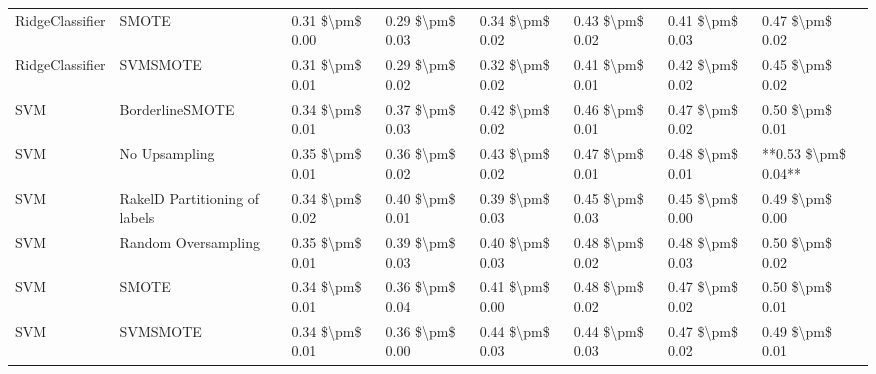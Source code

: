 \begin{tabular}{llllllll}
                RidgeClassifier &                         SMOTE & 0.31 \$\textbackslash pm\$ 0.00 &           0.29 \$\textbackslash pm\$ 0.03 &       0.34 \$\textbackslash pm\$ 0.02 &        0.43 \$\textbackslash pm\$ 0.02 &                         0.41 \$\textbackslash pm\$ 0.03 &     0.47 \$\textbackslash pm\$ 0.02 \\
                RidgeClassifier &                      SVMSMOTE & 0.31 \$\textbackslash pm\$ 0.01 &           0.29 \$\textbackslash pm\$ 0.02 &       0.32 \$\textbackslash pm\$ 0.02 &        0.41 \$\textbackslash pm\$ 0.01 &                         0.42 \$\textbackslash pm\$ 0.02 &     0.45 \$\textbackslash pm\$ 0.02 \\
                            SVM &               BorderlineSMOTE & 0.34 \$\textbackslash pm\$ 0.01 &           0.37 \$\textbackslash pm\$ 0.03 &       0.42 \$\textbackslash pm\$ 0.02 &        0.46 \$\textbackslash pm\$ 0.01 &                         0.47 \$\textbackslash pm\$ 0.02 &     0.50 \$\textbackslash pm\$ 0.01 \\
                            SVM &                 No Upsampling & 0.35 \$\textbackslash pm\$ 0.01 &           0.36 \$\textbackslash pm\$ 0.02 &       0.43 \$\textbackslash pm\$ 0.02 &        0.47 \$\textbackslash pm\$ 0.01 &                         0.48 \$\textbackslash pm\$ 0.01 & **0.53 \$\textbackslash pm\$ 0.04** \\
                            SVM & RakelD Partitioning of labels & 0.34 \$\textbackslash pm\$ 0.02 &           0.40 \$\textbackslash pm\$ 0.01 &       0.39 \$\textbackslash pm\$ 0.03 &        0.45 \$\textbackslash pm\$ 0.03 &                         0.45 \$\textbackslash pm\$ 0.00 &     0.49 \$\textbackslash pm\$ 0.00 \\
                            SVM &           Random Oversampling & 0.35 \$\textbackslash pm\$ 0.01 &           0.39 \$\textbackslash pm\$ 0.03 &       0.40 \$\textbackslash pm\$ 0.03 &        0.48 \$\textbackslash pm\$ 0.02 &                         0.48 \$\textbackslash pm\$ 0.03 &     0.50 \$\textbackslash pm\$ 0.02 \\
                            SVM &                         SMOTE & 0.34 \$\textbackslash pm\$ 0.01 &           0.36 \$\textbackslash pm\$ 0.04 &       0.41 \$\textbackslash pm\$ 0.00 &        0.48 \$\textbackslash pm\$ 0.02 &                         0.47 \$\textbackslash pm\$ 0.02 &     0.50 \$\textbackslash pm\$ 0.01 \\
                            SVM &                      SVMSMOTE & 0.34 \$\textbackslash pm\$ 0.01 &           0.36 \$\textbackslash pm\$ 0.00 &       0.44 \$\textbackslash pm\$ 0.03 &        0.44 \$\textbackslash pm\$ 0.03 &                         0.47 \$\textbackslash pm\$ 0.02 &     0.49 \$\textbackslash pm\$ 0.01 \\

\end{tabular}
